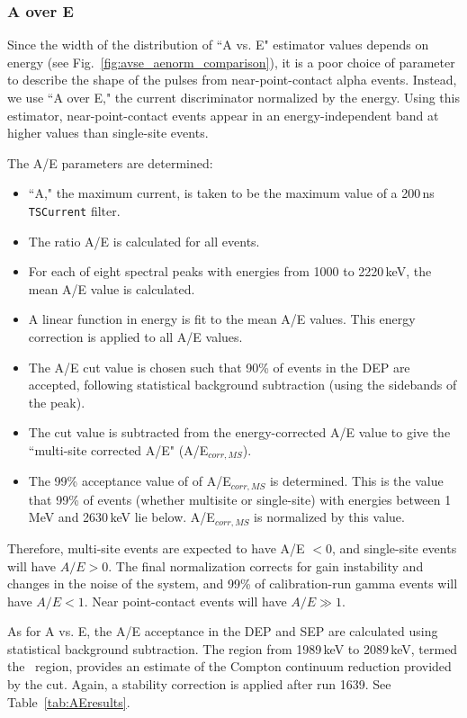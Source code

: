 \subsubsection{A over E}
Since the width of the distribution of ``A vs. E" estimator values depends on energy (see Fig.~\ref{fig:avse_aenorm_comparison}), it is a poor choice of parameter to describe the shape of the pulses from near-point-contact alpha events. Instead, we use ``A over E," the current discriminator normalized by the energy. Using this estimator, near-point-contact events appear in an energy-independent band at higher values than single-site events. 

The A/E parameters are determined: 
\begin{itemize}
\item ``A," the maximum current, is taken to be the maximum value of a 200\,ns {\tt TSCurrent} filter.
\item The ratio A/E is calculated for all events.
\item For each of eight spectral peaks with energies from 1000 to 2220\,keV, the mean A/E value is calculated.
\item A linear function in energy is fit to the mean A/E values. This energy correction is applied to all A/E values. 
\item The A/E cut value is chosen such that 90\% of events in the DEP are accepted, following statistical background subtraction (using the sidebands of the peak).
\item The cut value is subtracted from the energy-corrected A/E value to give the ``multi-site corrected A/E" (A/E$_{corr, MS}$).
\item The 99\% acceptance value of of A/E$_{corr, MS}$ is determined. This is the value that 99\% of events (whether multisite or single-site) with energies between 1\,MeV and 2630\,keV lie below. A/E$_{corr, MS}$ is normalized by this value.
\end{itemize}

Therefore, multi-site events are expected to have A/E $<0$, and single-site events will have $A/E>0$. The final normalization corrects for gain instability and changes in the noise of the system, and 99\% of calibration-run gamma events will have $A/E<1$. Near point-contact events will have $A/E \gg 1$. 
 
As for A vs. E, the A/E acceptance in the DEP and SEP are calculated using statistical background subtraction. The region from 1989\,keV to 2089\,keV, termed the \nonubb\ region, provides an estimate of the Compton continuum reduction provided by the cut. Again, a stability correction is applied after run 1639. See Table~\ref{tab:AEresults}. 

